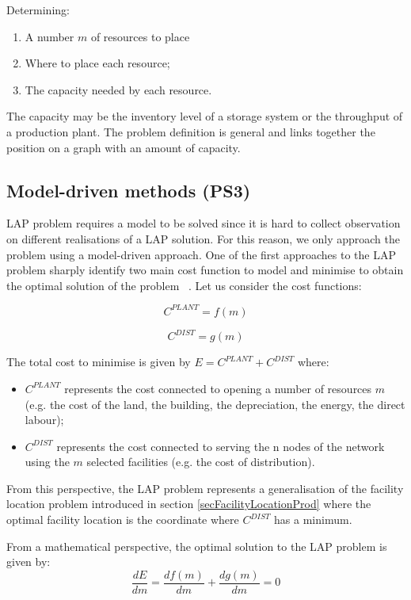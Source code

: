 Determining:

\begin{enumerate}
    \item A number $m$ of resources to place
	\item Where to place each resource;
	\item The capacity needed by each resource.

\end{enumerate}

The capacity may be the inventory level of a storage system or the throughput of a production plant. The problem definition is general and links together the position on a graph with an amount of capacity. 
\subsection{Model-driven methods (PS3)}
LAP problem requires a model to be solved since it is hard to collect observation on different realisations of a LAP solution. For this reason, we only approach the problem using a model-driven approach. One of the first approaches to the LAP problem sharply identify two main cost function to model and minimise to obtain the optimal solution of the problem ~\cite{Cooper1963}. Let us consider the cost functions:

\begin{equation}
    C^{PLANT}=f(m)
\end{equation}

\begin{equation}
    C^{DIST}=g(m)
\end{equation}

The total cost to minimise is given by $E=C^{PLANT}+C^{DIST}$ where:

\begin{itemize}
    \item $C^{PLANT}$ represents the cost connected to opening a number of resources $m$ (e.g. the cost of the land, the building, the depreciation, the energy, the direct labour);
    \item $C^{DIST}$ represents the cost connected to serving the n nodes of the network using the $m$ selected facilities (e.g. the cost of distribution).
\end{itemize}

From this perspective, the LAP problem represents a generalisation of the facility location problem introduced in section \ref{secFacilityLocationProd} where the optimal facility location is the coordinate where $C^{DIST}$ has a minimum.\par
From a mathematical perspective, the optimal solution to the LAP problem is given by:
\begin{equation}
    \frac{dE}{dm}=\frac{df(m)}{dm}+\frac{dg(m)}{dm}=0
    \label{eqLAP}
\end{equation}

